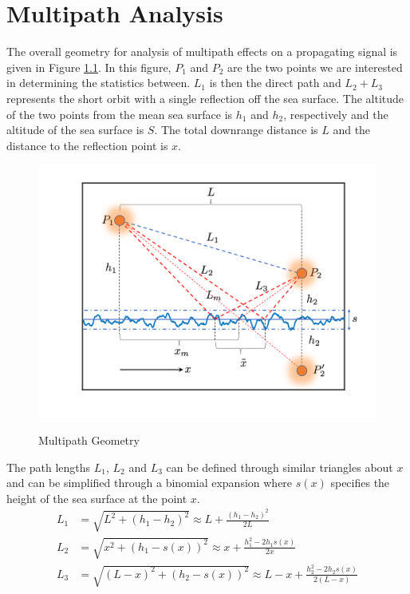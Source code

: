 \chapter{Multipath Analysis}

The overall geometry for analysis of multipath effects on a propagating signal is given in Figure \ref{mp_fig:1}. In this figure, $P_1$ and $P_2$ are the two points we are interested in determining the statistics between. $L_1$ is then the direct path and $L_2 + L_3$ represents the short orbit with a single reflection off the sea surface. The altitude of the two points from the mean sea surface is $h_1$ and $h_2$, respectively and the altitude of the sea surface is $S$. The total downrange distance is $L$ and the distance to the reflection point is $x$.

\begin{figure}[H]
  \begin{center}
\includegraphics[width=5in]{../media/analysis/multipath_layout.png}
  \end{center}
  \renewcommand{\baselinestretch}{1} \small\normalsize
  \begin{quote}
    \caption[Multipath Geometry]{ Multipath Geometry\label{mp_fig:1}}
  \end{quote}
\end{figure}
\renewcommand{\baselinestretch}{2} \small\normalsize


The path lengths $L_1$, $L_2$ and $L_3$ can be defined through similar triangles about $x$ and can be simplified through a binomial expansion where $s(x)$ specifies the height of the sea surface at the point $x$.
\begin{equation}
\begin{aligned}
L_1 & = \sqrt{L^2 + (h_1-h_2)^2}  \approx L + \frac{(h_1 - h_2)^2}{2L}\\
L_2 &= \sqrt{x^2 + \left( h_1 - s(x)\right)^2}  \approx x + \frac{h_1^2-2h_1s(x)}{2x}\\
L_3 & = \sqrt{\left(L - x\right)^2 + \left( h_2 - s(x)\right)^2}  \approx L-x + \frac{h_2^2 - 2h_2s(x)}{2\left(L-x\right)}\\
\end{aligned}
\label{mp_eq:1}
\end{equation}
\renewcommand{\baselinestretch}{2} \small\normalsize

